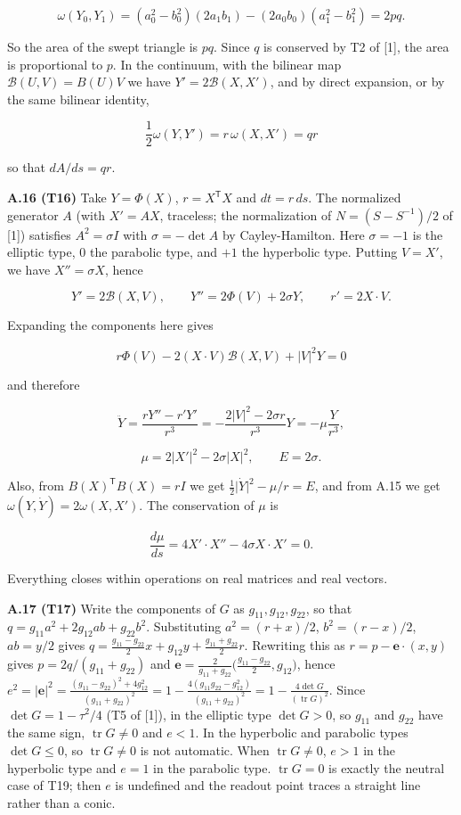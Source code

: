 \documentclass[
  a4paper,
]{article}
\begin{document}
\[
\omega(Y_0,Y_1)
=(a_0^2-b_0^2)(2a_1b_1)-(2a_0b_0)(a_1^2-b_1^2)
=2pq.
\]

So the area of the swept triangle is \(pq\). Since \(q\) is conserved by
T2 of {[}1{]}, the area is proportional to \(p\). In the continuum, with
the bilinear map \(\mathcal B(U,V)=B(U)V\) we have
\(Y'=2\mathcal B(X,X')\), and by direct expansion, or by the same
bilinear identity,

\[
\frac12\omega(Y,Y')=r\,\omega(X,X')=qr
\]

so that \(dA/ds=qr\).

\textbf{A.16 (T16)} Take \(Y=\Phi(X)\), \(r=X^{\mathsf T}X\) and
\(dt=r\,ds\). The normalized generator \(A\) (with \(X'=AX\), traceless;
the normalization of \(N=(S-S^{-1})/2\) of {[}1{]}) satisfies
\(A^2=\sigma I\) with \(\sigma=-\det A\) by Cayley-Hamilton. Here
\(\sigma=-1\) is the elliptic type, \(0\) the parabolic type, and \(+1\)
the hyperbolic type. Putting \(V=X'\), we have \(X''=\sigma X\), hence

\[
Y'=2\mathcal B(X,V),\qquad
Y''=2\Phi(V)+2\sigma Y,\qquad
r'=2X\cdot V.
\]

Expanding the components here gives

\[
r\Phi(V)-2(X\cdot V)\mathcal B(X,V)+\lvert V\rvert^2Y=0
\]

and therefore

\[
\ddot Y=\frac{rY''-r'Y'}{r^3}
=-\frac{2\lvert V\rvert^2-2\sigma r}{r^3}Y
=-\mu\frac{Y}{r^3},
\]

\[
\mu=2\lvert X'\rvert^2-2\sigma\lvert X\rvert^2,
\qquad E=2\sigma.
\]

Also, from \(B(X)^{\mathsf T}B(X)=rI\) we get
\(\frac12\lvert\dot Y\rvert^2-\mu/r=E\), and from A.15 we get
\(\omega(Y,\dot Y)=2\omega(X,X')\). The conservation of \(\mu\) is

\[
\frac{d\mu}{ds}=4X'\cdot X''-4\sigma X\cdot X'=0.
\]

Everything closes within operations on real matrices and real vectors.

\textbf{A.17 (T17)} Write the components of \(G\) as
\(g_{11},g_{12},g_{22}\), so that \(q=g_{11}a^2+2g_{12}ab+g_{22}b^2\).
Substituting \(a^2=(r+x)/2\), \(b^2=(r-x)/2\), \(ab=y/2\) gives
\(q=\frac{g_{11}-g_{22}}{2}x+g_{12}y+\frac{g_{11}+g_{22}}{2}r\).
Rewriting this as \(r=p-\mathbf e\cdot(x,y)\) gives
\(p=2q/(g_{11}+g_{22})\) and
\(\mathbf e=\frac{2}{g_{11}+g_{22}}\bigl(\frac{g_{11}-g_{22}}{2},g_{12}\bigr)\),
hence
\(e^2=\lvert\mathbf e\rvert^2=\frac{(g_{11}-g_{22})^2+4g_{12}^2}{(g_{11}+g_{22})^2}=1-\frac{4(g_{11}g_{22}-g_{12}^2)}{(g_{11}+g_{22})^2}=1-\frac{4\det G}{(\operatorname{tr}G)^2}\).
Since \(\det G=1-\tau^2/4\) (T5 of {[}1{]}), in the elliptic type
\(\det G>0\), so \(g_{11}\) and \(g_{22}\) have the same sign,
\(\operatorname{tr}G\neq0\) and \(e<1\). In the hyperbolic and parabolic
types \(\det G\le0\), so \(\operatorname{tr}G\neq0\) is not automatic.
When \(\operatorname{tr}G\neq0\), \(e>1\) in the hyperbolic type and
\(e=1\) in the parabolic type. \(\operatorname{tr}G=0\) is exactly the
neutral case of T19; then \(e\) is undefined and the readout point
traces a straight line rather than a conic.
\end{document}
